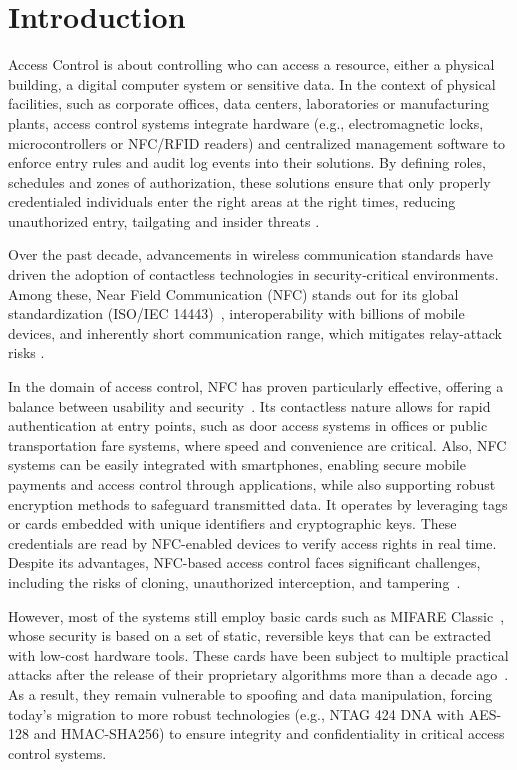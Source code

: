\chapter{Introduction}
\label{chap:introduction}
Access Control is about controlling who can access a resource, either a physical building, a digital computer system or sensitive data. In the context of physical facilities, such as corporate offices, data centers, laboratories or manufacturing plants, access control systems integrate hardware (e.g., electromagnetic locks, microcontrollers or NFC/RFID readers) and centralized management software to enforce entry rules and audit log events into their solutions. By defining roles, schedules and zones of authorization, these solutions ensure that only properly credentialed individuals enter the right areas at the right times, reducing unauthorized entry, tailgating and insider threats \cite{Ref1}.

Over the past decade, advancements in wireless communication standards have driven the adoption of contactless technologies in security‑critical environments. Among these, Near Field Communication (NFC) stands out for its global standardization (ISO/IEC 14443)~\cite{Ref23}, interoperability with billions of mobile devices, and inherently short communication range, which mitigates relay‑attack risks \cite{Ref73}.

In the domain of access control, NFC has proven particularly effective, offering a balance between usability and security~\cite{Ref72}. Its contactless nature allows for rapid authentication at entry points, such as door access systems in offices or public transportation fare systems, where speed and convenience are critical. Also, NFC systems can be easily integrated with smartphones, enabling secure mobile payments and access control through applications, while also supporting robust encryption methods to safeguard transmitted data. It operates by leveraging tags or cards embedded with unique identifiers and cryptographic keys. These credentials are read by NFC-enabled devices to verify access rights in real time. Despite its advantages, NFC-based access control faces significant challenges, including the risks of cloning, unauthorized interception, and tampering~\cite{Ref2}.

However, most of the systems still employ basic cards such as MIFARE Classic~\cite{Ref28}, whose security is based on a set of static, reversible keys that can be extracted with low-cost hardware tools. These cards have been subject to multiple practical attacks after the release of their proprietary algorithms more than a decade ago~\cite{Ref79}. As a result, they remain vulnerable to spoofing and data manipulation, forcing today's migration to more robust technologies (e.g., NTAG 424 DNA with AES-128 and HMAC-SHA256) to ensure integrity and confidentiality in critical access control systems.

